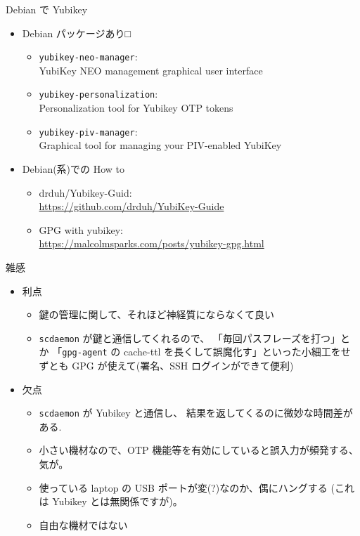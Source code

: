 \documentclass[cjk,c,squeeze,shrink,dvipdfmx,11pt,%
hyperref={bookmarks=true,bookmarksnumbered=true,bookmarksopen=false,%
colorlinks=false,%
pdftitle={},%
pdfauthor={}%
pdfinstitute={関西 Debian 勉強会},%
pdfsubject={},%
}]{beamer}
\begin{document}
\begin{frame}{Debian で Yubikey}
  \begin{itemize}
  \item %
    Debian パッケージあり□
    \begin{itemize}
    \item %
      \texttt{yubikey-neo-manager}: \\
      YubiKey NEO management graphical user interface
    \item %
      \texttt{yubikey-personalization}: \\
      Personalization tool for Yubikey OTP tokens
    \item %
      \texttt{yubikey-piv-manager}: \\
      Graphical tool for managing your PIV-enabled YubiKey
    \end{itemize}
  \item %
    Debian(系)での How to
    \begin{itemize}
    \item %
      drduh/Yubikey-Guid:\\
      \url{https://github.com/drduh/YubiKey-Guide}
    \item %
      GPG with yubikey:\\
      \url{https://malcolmsparks.com/posts/yubikey-gpg.html}
    \end{itemize}
  \end{itemize}
\end{frame}
\begin{frame}{雑感}
  \begin{itemize}
  \item %
    利点
    \begin{itemize}
    \item %
      鍵の管理に関して、それほど神経質にならなくて良い
    \item
      \texttt{scdaemon} が鍵と通信してくれるので、
      「毎回パスフレーズを打つ」とか
      「\texttt{gpg-agent} の cache-ttl を長くして誤魔化す」といった小細工をせずとも
      GPG が使えて(署名、SSH ログインができて便利)
    \end{itemize}
  \item %
    欠点
    \begin{itemize}
    \item %
      \texttt{scdaemon} が Yubikey と通信し、
      結果を返してくるのに微妙な時間差がある.
    \item %
      小さい機材なので、OTP 機能等を有効にしていると誤入力が頻発する、気が。
    \item %
      使っている laptop の USB ポートが変(?)なのか、偶にハングする
      (これは Yubikey とは無関係ですが)。
    \item %
      自由な機材ではない
    \end{itemize}
  \end{itemize}
\end{frame}
\end{document}
